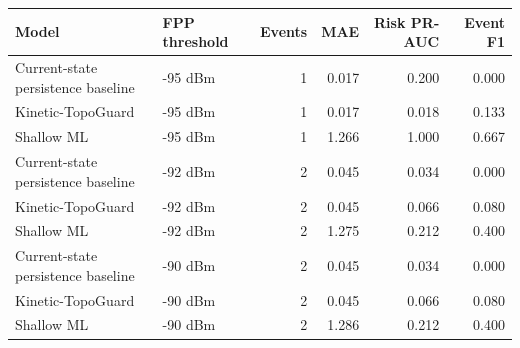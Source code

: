 \begin{tabular}{llrrrr}
\toprule
Model & FPP threshold & Events & MAE & Risk PR-AUC & Event F1 \\
\midrule
Current-state persistence baseline & -95 dBm & 1 & 0.017 & 0.200 & 0.000 \\
Kinetic-TopoGuard & -95 dBm & 1 & 0.017 & 0.018 & 0.133 \\
Shallow ML & -95 dBm & 1 & 1.266 & 1.000 & 0.667 \\
Current-state persistence baseline & -92 dBm & 2 & 0.045 & 0.034 & 0.000 \\
Kinetic-TopoGuard & -92 dBm & 2 & 0.045 & 0.066 & 0.080 \\
Shallow ML & -92 dBm & 2 & 1.275 & 0.212 & 0.400 \\
Current-state persistence baseline & -90 dBm & 2 & 0.045 & 0.034 & 0.000 \\
Kinetic-TopoGuard & -90 dBm & 2 & 0.045 & 0.066 & 0.080 \\
Shallow ML & -90 dBm & 2 & 1.286 & 0.212 & 0.400 \\
\bottomrule
\end{tabular}
